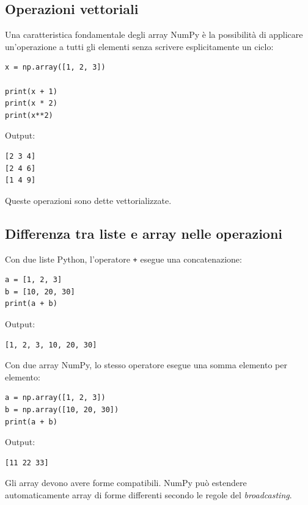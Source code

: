\documentclass[11pt,a4paper]{book}
\begin{document}
\subsection{Operazioni vettoriali}

Una caratteristica fondamentale degli array NumPy è la possibilità di applicare un'operazione a tutti gli elementi senza scrivere esplicitamente un ciclo:

\begin{lstlisting}[style=python]
x = np.array([1, 2, 3])

print(x + 1)
print(x * 2)
print(x**2)
\end{lstlisting}

Output:

\begin{lstlisting}[style=python, numbers=none]
[2 3 4]
[2 4 6]
[1 4 9]
\end{lstlisting}

Queste operazioni sono dette vettorializzate.

\subsection{Differenza tra liste e array nelle operazioni}

Con due liste Python, l'operatore \texttt{+} esegue una concatenazione:

\begin{lstlisting}[style=python]
a = [1, 2, 3]
b = [10, 20, 30]
print(a + b)
\end{lstlisting}

Output:

\begin{lstlisting}[style=python, numbers=none]
[1, 2, 3, 10, 20, 30]
\end{lstlisting}

Con due array NumPy, lo stesso operatore esegue una somma elemento per elemento:

\begin{lstlisting}[style=python]
a = np.array([1, 2, 3])
b = np.array([10, 20, 30])
print(a + b)
\end{lstlisting}

Output:

\begin{lstlisting}[style=python, numbers=none]
[11 22 33]
\end{lstlisting}

Gli array devono avere forme compatibili. NumPy può estendere automaticamente array di forme differenti secondo le regole del \emph{broadcasting}.
\end{document}
